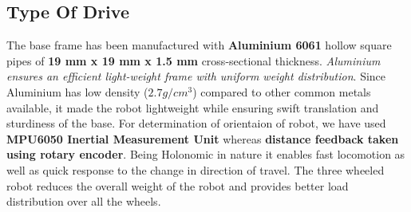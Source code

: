     \subsection{Type Of Drive}
        The base frame has been manufactured with \textbf{Aluminium 6061} hollow square pipes of \textbf{19 mm x 19 mm x 1.5 mm} cross-sectional thickness. 
        \textit{Aluminium ensures an efficient light-weight frame with uniform weight distribution}. Since Aluminium has low density ($2.7 g/cm^3$) compared 
        to other common metals available, it made the robot lightweight while ensuring swift translation and sturdiness of the base. For determination of orientaion 
        of robot, we have used \textbf{MPU6050 Inertial Measurement Unit} whereas \textbf{distance feedback taken using rotary encoder}. Being Holonomic 
        in nature it enables fast locomotion as well as quick response to the change in direction of travel. The three wheeled robot reduces the 
        overall weight of the robot and provides better load distribution over all the wheels.




